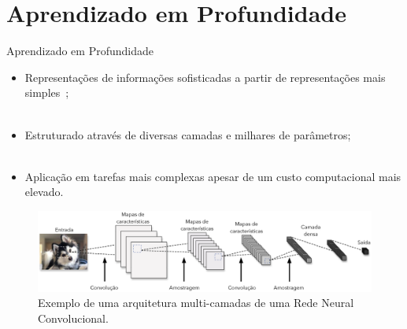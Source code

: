 \section{Aprendizado em Profundidade}
\label{s.deep_learning}

\begin{frame}{Aprendizado em Profundidade}
	\begin{itemize}
		\justifying
		\item Representações de informações sofisticadas a partir de representações mais simples~\cite{Hinton:86};
		\\~\\
		\item Estruturado através de diversas camadas e milhares de parâmetros;
		\\~\\
		\item Aplicação em tarefas mais complexas apesar de um custo computacional mais elevado.
	\end{itemize}
\end{frame}

\begin{frame}
	\begin{figure}
		\centering
		\includegraphics[scale=0.275]{figs/deep_learning.eps}	
		\caption{Exemplo de uma arquitetura multi-camadas de uma Rede Neural Convolucional.}
		\label{f.deep_learning}
	\end{figure}
\end{frame}
